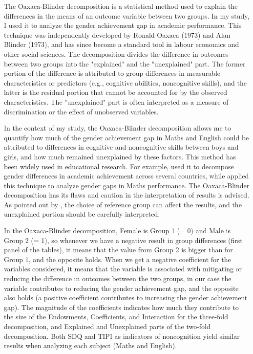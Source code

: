 \documentclass[12pt,a4paper,onecolumn]{article}
\numberwithin{equation}{section}
\begin{document}
The Oaxaca-Blinder decomposition is a statistical method used to explain the differences in the means of an outcome variable between two groups. In my study, I used it to analyze the gender achievement gap in academic performance. This technique was independently developed by Ronald Oaxaca (1973) and Alan Blinder (1973), and has since become a standard tool in labour economics and other social sciences.  The decomposition divides the difference in outcomes between two groups into the "explained" and the "unexplained" part. The former portion of the difference is attributed to group differences in measurable characteristics or predictors (e.g., cognitive abilities, noncognitive skills), and the latter is the residual portion that cannot be accounted for by the observed characteristics. The "unexplained" part is often interpreted as a measure of discrimination or the effect of unobserved variables.

In the context of my study, the Oaxaca-Blinder decomposition allows me to quantify how much of the gender achievement gap in Maths and English could be attributed to differences in cognitive and noncognitive skills between boys and girls, and how much remained unexplained by these factors.
This method has been widely used in educational research. For example, \textcite{fortin2015} used it to decompose gender differences in academic achievement across several countries, while \textcite{niederle2010} applied this technique to analyze gender gaps in Maths performance.
The Oaxaca-Blinder decomposition has its flaws and caution in the interpretation of results is advised. As pointed out by \textcite{jones1984}, the choice of reference group can affect the results, and the unexplained portion should be carefully interpreted.

In the Oaxaca-Blinder decomposition, Female is Group 1 (= 0) and Male is Group 2 (= 1), so whenever we have a negative result in group differences (first panel of the tables), it means that the value from Group 2 is bigger than for Group 1, and the opposite holds. When we get a negative coefficient for the variables considered, it means that the variable is associated with mitigating or reducing the difference in outcomes between the two groups, in our case the variable contributes to reducing the gender achievement gap, and the opposite also holds (a positive coefficient contributes to increasing the gender achievement gap). The magnitude of the coefficients indicates how much they contribute to the size of the Endowments, Coefficients, and Interaction for the three-fold decomposition, and Explained and Unexplained parts of the two-fold decomposition. Both SDQ and TIPI as indicators of noncognition yield similar results when analyzing each subject (Maths and English). 
\end{document}
